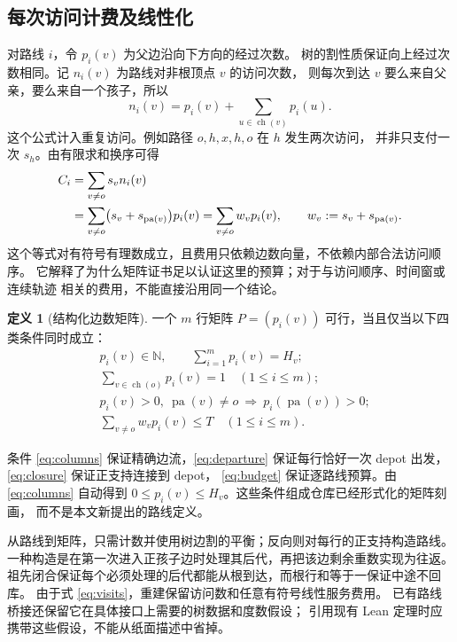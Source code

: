 \documentclass[UTF8,a4paper,11pt,fontset=fandol]{ctexart}
\theoremstyle{definition}
\newtheorem{definition}[theorem]{定义}
\newcommand{\N}{\mathbb N}
\newcommand{\parv}{\operatorname{pa}}
\newcommand{\ch}{\operatorname{ch}}
\begin{document}
\subsection{每次访问计费及线性化}

对路线 $i$，令 $p_i(v)$ 为父边沿向下方向的经过次数。
树的割性质保证向上经过次数相同。记 $n_i(v)$ 为路线对非根顶点 $v$ 的访问次数，
则每次到达 $v$ 要么来自父亲，要么来自一个孩子，所以
\begin{equation}\label{eq:visits}
n_i(v)=p_i(v)+\sum_{u\in\ch(v)}p_i(u).
\end{equation}
这个公式计入重复访问。例如路径 $o,h,x,h,o$ 在 $h$ 发生两次访问，
并非只支付一次 $s_h$。由有限求和换序可得
\begin{align}
C_i
 &=\sum_{v\neq o}s_v n_i(v)\notag\\
 &=\sum_{v\neq o}\bigl(s_v+s_{\parv(v)}\bigr)p_i(v)
   =\sum_{v\neq o}w_v p_i(v),\qquad
w_v:=s_v+s_{\parv(v)}.                    \label{eq:linear-cost}
\end{align}
这个等式对有符号有理数成立，且费用只依赖边数向量，不依赖内部合法访问顺序。
它解释了为什么矩阵证书足以认证这里的预算；对于与访问顺序、时间窗或连续轨迹
相关的费用，不能直接沿用同一个结论。

\begin{definition}[结构化边数矩阵]\label{def:matrix}
一个 $m$ 行矩阵 $P=(p_i(v))$ 可行，当且仅当以下四类条件同时成立：
\begin{align}
&p_i(v)\in\N,\qquad \sum_{i=1}^m p_i(v)=H_v;          \label{eq:columns}\\
&\sum_{v\in\ch(o)}p_i(v)=1 \quad(1\le i\le m);       \label{eq:departure}\\
&p_i(v)>0,\ \parv(v)\neq o\ \Longrightarrow\
    p_i(\parv(v))>0;                                \label{eq:closure}\\
&\sum_{v\neq o}w_vp_i(v)\le T \quad(1\le i\le m).    \label{eq:budget}
\end{align}
\end{definition}

条件 \eqref{eq:columns} 保证精确边流，\eqref{eq:departure} 保证每行恰好一次
depot 出发，\eqref{eq:closure} 保证正支持连接到 depot，
\eqref{eq:budget} 保证逐路线预算。由 \eqref{eq:columns} 自动得到
$0\le p_i(v)\le H_v$。这些条件组成仓库已经形式化的矩阵刻画，
而不是本文新提出的路线定义。

从路线到矩阵，只需计数并使用树边割的平衡；反向则对每行的正支持构造路线。
一种构造是在第一次进入正孩子边时处理其后代，再把该边剩余重数实现为往返。
祖先闭合保证每个必须处理的后代都能从根到达，而根行和等于一保证中途不回库。
由于式 \eqref{eq:visits}，重建保留访问数和任意有符号线性服务费用。
已有路线桥接还保留它在具体接口上需要的树数据和度数假设；
引用现有 Lean 定理时应携带这些假设，不能从纸面描述中省掉。
\end{document}
